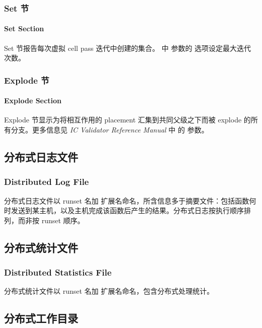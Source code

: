\subsubsection{Set 节}
\paragraph*{Set Section}

Set 节报告每次虚拟 cell pass 迭代中创建的集合。 中  参数的  选项设定最大迭代次数。

\subsubsection{Explode 节}
\paragraph*{Explode Section}

Explode 节显示为将相互作用的 placement 汇集到共同父级之下而被 explode 的所有分支。更多信息见 \textit{IC Validator Reference Manual} 中  的  参数。

\subsection{分布式日志文件}
\subsubsection*{Distributed Log File}

分布式日志文件以 runset 名加  扩展名命名，所含信息多于摘要文件：包括函数何时发送到某主机，以及主机完成该函数后产生的结果。分布式日志按执行顺序排列，而非按 runset 顺序。

\subsection{分布式统计文件}
\subsubsection*{Distributed Statistics File}

分布式统计文件以 runset 名加  扩展名命名，包含分布式处理统计。

\subsection{分布式工作目录}
